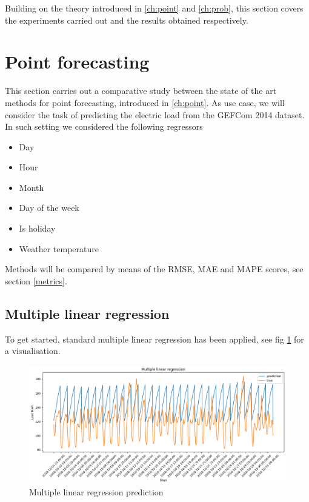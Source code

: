 Building on the theory introduced in \ref{ch:point} and \ref{ch:prob}, this section covers the experiments carried out and the results obtained respectively.


\section{Point forecasting}
This section carries out a comparative study between the state of the art methods for point forecasting, introduced in \ref{ch:point}.
As use case, we will consider the task of predicting the electric load from the GEFCom 2014 dataset.
In such setting we considered the following regressors
\begin{itemize}
    \item Day
    \item Hour
    \item Month
    \item Day of the week
    \item Is holiday
    \item Weather temperature
\end{itemize}
Methods will be compared by means of the RMSE, MAE and MAPE scores, see section \ref{metrics}.
\subsection{Multiple linear regression}
To get started, standard multiple linear regression has been applied, see fig \ref{fig:mlr_price} for a visualisation. 
\begin{figure}
    \includegraphics[width=\textwidth]{images/mlr_price.png}
    \caption{Multiple linear regression prediction}
    \label{fig:mlr_price}
\end{figure}

